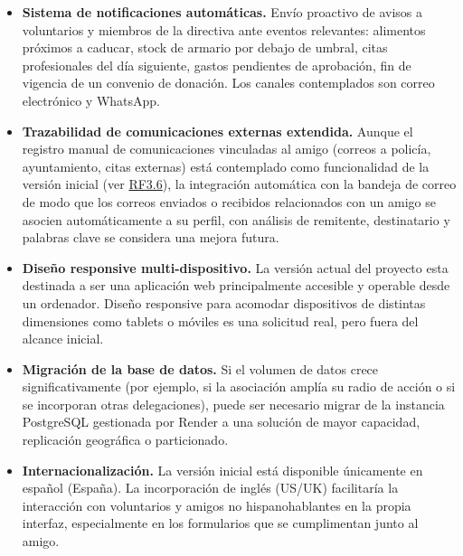 \begin{itemize}
    \item \textbf{Sistema de notificaciones automáticas.} Envío proactivo de avisos a
    voluntarios y miembros de la directiva ante eventos relevantes: alimentos
    próximos a caducar, stock de armario por debajo de umbral, citas profesionales
    del día siguiente, gastos pendientes de aprobación, fin de vigencia de un
    convenio de donación. Los canales contemplados son correo electrónico y
    WhatsApp.

    \item \textbf{Trazabilidad de comunicaciones externas extendida.} Aunque el registro
    manual de comunicaciones vinculadas al amigo (correos a policía,
    ayuntamiento, citas externas) está contemplado como funcionalidad de la
    versión inicial (ver \hyperlink{RF3.6}{RF3.6}), la integración automática con la %
    bandeja de correo de modo que los correos enviados o
    recibidos relacionados con un amigo se asocien automáticamente a su perfil,
    con análisis de remitente, destinatario y palabras clave se considera una
    mejora futura.

    \item \textbf{Diseño responsive multi-dispositivo.} La versión actual del proyecto esta destinada a ser una aplicación web 
    principalmente accesible y operable desde un ordenador. Diseño responsive para acomodar dispositivos de distintas dimensiones 
    como tablets o móviles es una solicitud real, pero fuera del alcance inicial.

    \item \textbf{Migración de la base de datos.} Si el
    volumen de datos crece significativamente (por ejemplo, si la asociación
    amplía su radio de acción o si se incorporan otras delegaciones), puede
    ser necesario migrar de la instancia PostgreSQL gestionada por Render a
    una solución de mayor capacidad, replicación geográfica o particionado.

    \item \textbf{Internacionalización.} La versión inicial está disponible únicamente en
    español (España). La incorporación de inglés (US/UK) facilitaría la
    interacción con voluntarios y amigos no hispanohablantes en la propia
    interfaz, especialmente en los formularios que se cumplimentan junto al
    amigo.


\end{itemize}
